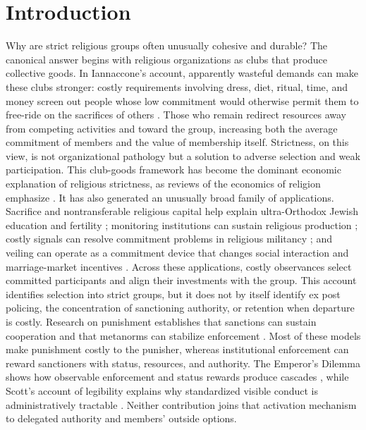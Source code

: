 \documentclass[12pt]{article}
\begin{document}
\section{Introduction}

Why are strict religious groups often unusually cohesive and durable? The canonical answer begins with religious organizations as clubs that produce collective goods. In Iannaccone's account, apparently wasteful demands can make these clubs stronger: costly requirements involving dress, diet, ritual, time, and money screen out people whose low commitment would otherwise permit them to free-ride on the sacrifices of others \citep{iannaccone1988,iannaccone1992,iannaccone1994}. Those who remain redirect resources away from competing activities and toward the group, increasing both the average commitment of members and the value of membership itself. Strictness, on this view, is not organizational pathology but a solution to adverse selection and weak participation. This club-goods framework has become the dominant economic explanation of religious strictness, as reviews of the economics of religion emphasize \citep{iyer2016,carvalho2019}. It has also generated an unusually broad family of applications. Sacrifice and nontransferable religious capital help explain ultra-Orthodox Jewish education and fertility \citep{berman2000}; monitoring institutions can sustain religious production \citep{mcbride2007}; costly signals can resolve commitment problems in religious militancy \citep{bermanlaitin2008}; and veiling can operate as a commitment device that changes social interaction and marriage-market incentives \citep{carvalho2013}. Across these applications, costly observances select committed participants and align their investments with the group. This account identifies selection into strict groups, but it does not by itself identify ex post policing, the concentration of sanctioning authority, or retention when departure is costly. Research on punishment establishes that sanctions can sustain cooperation \citep{fehrgachter2000,fehr2002,boyd2003,boydgintisbowles2010,hauertetal2007} and that metanorms can stabilize enforcement \citep{axelrod1986}. Most of these models make punishment costly to the punisher, whereas institutional enforcement can reward sanctioners with status, resources, and authority. The Emperor's Dilemma shows how observable enforcement and status rewards produce cascades \citep{centola2005}, while Scott's account of legibility explains why standardized visible conduct is administratively tractable \citep{scott1998}. Neither contribution joins that activation mechanism to delegated authority and members' outside options.
\end{document}
